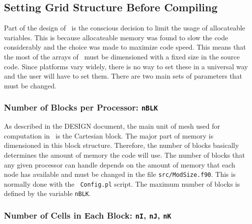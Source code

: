 \subsection{Setting Grid Structure Before Compiling \BATSRUS\ \label{section:before_compile}}

Part of the design of \BATSRUS\ is the conscious decision to limit the
usage of allocateable variables.  This is because
allocateable memory was found to slow the code considerably and 
the choice was made to maximize code speed.  This means that the
most of the arrays of \BATSRUS\ must be dimensioned with a fixed size
in the source code. 
Since platforms vary widely, there is no way to set these in a universal
way and the user will have to set them.  There are two main sets of 
parameters that must be changed.

\subsubsection{Number of Blocks per Processor: {\tt nBLK} \label{section:nblk}}

As described in the DESIGN document, the main unit of mesh used for
computation in \BATSRUS\ is the Cartesian block.  The major part of
memory is dimensioned in this block structure.  Therefore, the number
of blocks basically determines the amount of memory the code will use.
The number of blocks that any given processor can handle depends on
the amount of memory that each node has available and must be changed
in the file {\tt src/ModSize.f90}. This is normally done with the {\tt
Config.pl} script.  The maximum number of blocks is defined by the
variable {\tt nBLK}.

\subsubsection{Number of Cells in Each Block: {\tt nI},
{\tt nJ}, {\tt nK} \label{section:ncells}}

